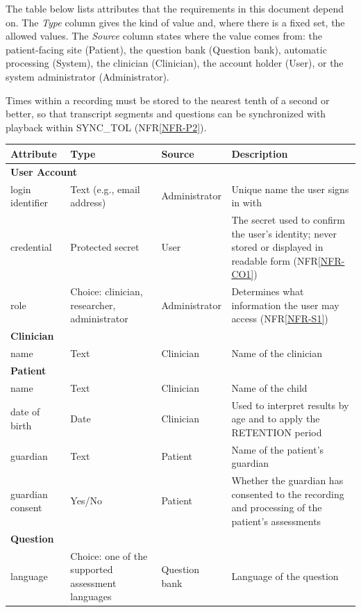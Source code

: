 \documentclass[12pt]{article}
\newcommand{\nfrref}[1]{NFR\ref{#1}}
\begin{document}
The table below lists attributes that the requirements in this document depend on. The \emph{Type} column gives the kind of value and, where there is a fixed set, the allowed values. The \emph{Source} column states where the value comes from: the patient-facing site (Patient), the question bank (Question bank), automatic processing (System), the clinician (Clinician), the account holder (User), or the system administrator (Administrator).

Times within a recording must be stored to the nearest tenth of a second or better, so that transcript segments and questions can be synchronized with playback within SYNC\_TOL (\nfrref{NFR-P2}).

\begin{longtable}{p{} p{} p{} p{}}
\toprule
Attribute & Type & Source & Description\\
\midrule
\endhead
\multicolumn{4}{l}{\textbf{User Account}}\\
\midrule
login identifier & Text (e.g., email address) & Administrator & Unique name the user signs in with\\
credential & Protected secret & User & The secret used to confirm the user’s identity; never stored or displayed in readable form (\nfrref{NFR-CO1})\\
role & Choice: clinician, researcher, administrator & Administrator & Determines what information the user may access (\nfrref{NFR-S1})\\
\midrule
\multicolumn{4}{l}{\textbf{Clinician}}\\
\midrule
name & Text & Clinician & Name of the clinician\\
\midrule
\multicolumn{4}{l}{\textbf{Patient}}\\
\midrule
name & Text & Clinician & Name of the child\\
date of birth & Date & Clinician & Used to interpret results by age and to apply the RETENTION period\\
guardian & Text & Patient & Name of the patient’s guardian\\
guardian consent & Yes/No & Patient & Whether the guardian has consented to the recording and processing of the patient’s assessments\\
\midrule
\multicolumn{4}{l}{\textbf{Question}}\\
\midrule
language & Choice: one of the supported assessment languages & Question bank & Language of the question\\

\end{longtable}
\end{document}
